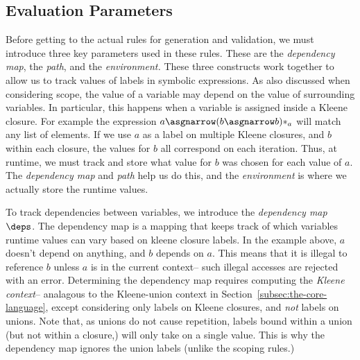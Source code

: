 \subsection{Evaluation Parameters}
\label{sec:mappings}
Before getting to the actual rules for generation and validation,
we must introduce three key parameters used in these rules.
These are the \textit{dependency map},
the \textit{path},
and the \textit{environment.}
These three constructs work together
to allow us to track values of labels in symbolic expressions.
As also discussed when considering scope,
the value of a variable may depend on the value of surrounding variables.
In particular, this happens when a variable is assigned inside a Kleene closure.
For example the expression $a \asgnarrow (b \asgnarrow b)*_{a}$ will match any list of elements. 
If we use $a$ as a label on multiple Kleene closures,
and $b$ within each closure,
the values for $b$ all correspond on each iteration.
Thus, at runtime, we must track and store what value for $b$ was chosen for each value of $a$.
The \textit{dependency map} and \textit{path}
help us do this,
and the \textit{environment} is where we actually store the runtime values.


To track dependencies between variables, we introduce the \textit{dependency map} $\deps$. 
The dependency map is a mapping that keeps track of which variables runtime values
can vary based on kleene closure labels.
In the example above, $a$ doesn't depend on anything, and $b$ depends on $a$. 
This means that it is illegal to reference $b$ unless $a$ is in the current context--
such illegal accesses are rejected with an error.
Determining the dependency map requires computing
the \textit{Kleene context}--
analagous to the Kleene-union context in 
Section~\ref{subsec:the-core-language},
except considering only labels on Kleene closures, and \textit{not} labels on unions.
Note that, as unions do not cause
repetition,
labels bound within a union (but not within a closure,)
will only take on a single value.
This is why the dependency map ignores the union labels (unlike the scoping rules.)

